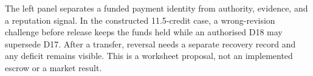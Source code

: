 \documentclass[11pt]{article}\usepackage[paperwidth=7in,paperheight=10in,textwidth=4.5in,textheight=8in,centering]{geometry}
\begin{document}
\begin{center}\end{center}\medskip\noindent\footnotesize\raggedright The left panel separates a funded payment identity from authority, evidence, and a reputation signal. In the constructed 11.5-credit case, a wrong-revision challenge before release keeps the funds held while an authorised D18 may supersede D17. After a transfer, reversal needs a separate recovery record and any deficit remains visible. This is a worksheet proposal, not an implemented escrow or a market result.
\end{document}

